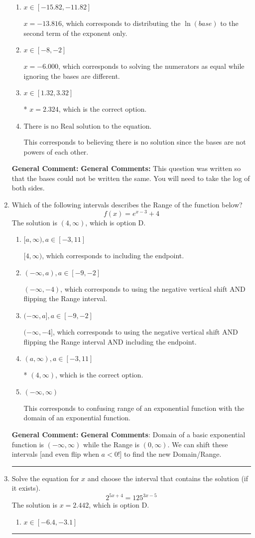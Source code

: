 \documentclass{extbook}[14pt]
\newcommand{\litem}[1]{\item #1

\rule{\textwidth}{0.4pt}}
\begin{document}
\begin{enumerate}
{\begin{enumerate}[label=\Alph*.]
$x = 1.009$, which corresponds to distributing the $\ln(base)$ to the first term of the exponent only.
\item \( x \in [-15.82, -11.82] \)

$x = -13.816$, which corresponds to distributing the $\ln(base)$ to the second term of the exponent only.
\item \( x \in [-8, -2] \)

$x = -6.000$, which corresponds to solving the numerators as equal while ignoring the bases are different.
\item \( x \in [1.32, 3.32] \)

* $x = 2.324$, which is the correct option.
\item \( \text{There is no Real solution to the equation.} \)

This corresponds to believing there is no solution since the bases are not powers of each other.
\end{enumerate}

\textbf{General Comment:} \textbf{General Comments:} This question was written so that the bases could not be written the same. You will need to take the log of both sides.
}
\litem{
Which of the following intervals describes the Range of the function below?
\[ f(x) = e^{x-3}+4 \]The solution is \( (4, \infty) \), which is option D.\begin{enumerate}[label=\Alph*.]
\item \( [a, \infty), a \in [-3, 11] \)

$[4, \infty)$, which corresponds to including the endpoint.
\item \( (-\infty, a), a \in [-9, -2] \)

$(-\infty, -4)$, which corresponds to using the negative vertical shift AND flipping the Range interval.
\item \( (-\infty, a], a \in [-9, -2] \)

$(-\infty, -4]$, which corresponds to using the negative vertical shift AND flipping the Range interval AND including the endpoint.
\item \( (a, \infty), a \in [-3, 11] \)

* $(4, \infty)$, which is the correct option.
\item \( (-\infty, \infty) \)

This corresponds to confusing range of an exponential function with the domain of an exponential function.
\end{enumerate}

\textbf{General Comment:} \textbf{General Comments}: Domain of a basic exponential function is $(-\infty, \infty)$ while the Range is $(0, \infty)$. We can shift these intervals [and even flip when $a<0$!] to find the new Domain/Range.
}
\litem{
Solve the equation for $x$ and choose the interval that contains the solution (if it exists).
\[ 2^{5x+4} = 125^{3x-5} \]The solution is \( x = 2.442 \), which is option D.\begin{enumerate}[label=\Alph*.]
\item \( x \in [-6.4, -3.1] \)


\end{enumerate}}
\end{enumerate}
\end{document}
